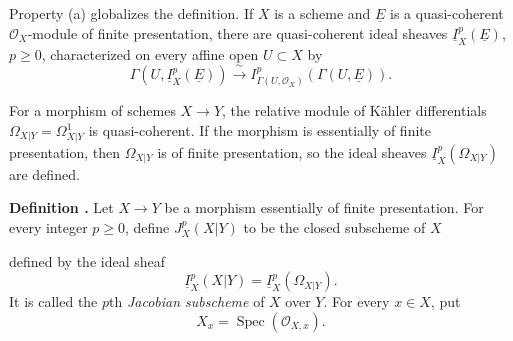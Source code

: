 Property (a) globalizes the definition. If $X$ is a scheme and
$\underline E$ is a quasi-coherent $\mathcal O_X$-module of finite
presentation, there are quasi-coherent ideal sheaves
$\underline I_X^p(\underline E)$, $p\geq0$, characterized on every
affine open $U\subset X$ by
\[
\Gamma(U,\underline I_X^p(\underline E))
\xrightarrow{\ \sim\ }
I_{\Gamma(U,\mathcal O_X)}^p(\Gamma(U,\underline E)).
\]

For a morphism of schemes $X\longrightarrow Y$, the relative module
of K\"ahler differentials
$\Omega_{X|Y}=\Omega^1_{X|Y}$ is quasi-coherent. If the morphism is
essentially of finite presentation, then $\Omega_{X|Y}$ is of finite
presentation, so the ideal sheaves
$\underline I_X^p(\Omega_{X|Y})$ are defined.

\medskip
\noindent\textbf{Definition .}
Let $X\longrightarrow Y$ be a morphism essentially of finite
presentation. For every integer $p\geq0$, define $J_X^p(X|Y)$ to be
the closed subscheme of $X$


\noindent defined by the ideal sheaf
\[
\underline I_X^p(X|Y)=\underline I_X^p(\Omega_{X|Y}).
\]
It is called the $p$th \emph{Jacobian subscheme} of $X$ over $Y$.
For every $x\in X$, put
\[
X_x=\operatorname{Spec}(\mathcal O_{X,x}).
\]

